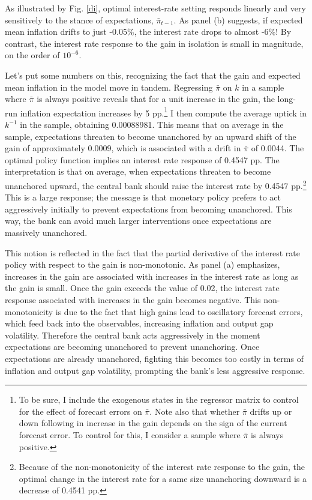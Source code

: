 \documentclass[11pt]{article}
\renewcommand{\[}{\begin{equation}}
\renewcommand{\]}{\end{equation}}
\def\ppMoveFFR{0.4547 }
\begin{document}
As illustrated by Fig. \ref{di}, optimal interest-rate setting responds linearly and very sensitively to the stance of expectations, $\bar{\pi}_{t-1}$. As panel (b) suggests, if expected mean inflation drifts to just -0.05\%, the interest rate drops to almost -6\%! By contrast, the interest rate response to the gain in isolation is small in magnitude, on the order of $10^{-6}$. 

Let's put some numbers on this, recognizing the fact that the gain and expected mean inflation in the model move in tandem. Regressing $\bar{\pi}$ on $k$ in a sample where $\bar{\pi}$ is always positive reveals that for a unit increase in the gain, the long-run inflation expectation increases by 5 pp.\footnote{To be sure, I include the exogenous states in the regressor matrix to control for the effect of forecast errors on $\bar{\pi}$. Note also that whether $\bar{\pi}$ drifts up or down following in increase in the gain depends on the sign of the current forecast error. To control for this, I consider a sample where $\bar{\pi}$ is always positive.} I then compute the average uptick in $k^{-1}$ in the sample, obtaining 0.00088981. This means that on average in the sample, expectations threaten to become unanchored by an upward shift of the gain of approximately 0.0009, which is associated with a drift in $\bar{\pi}$ of 0.0044. The optimal policy function implies an interest rate response of \ppMoveFFR pp. The interpretation is that on average, when expectations threaten to become unanchored upward, the central bank should raise the interest rate by \ppMoveFFR pp.\footnote{Because of the non-monotonicity of the interest rate response to the gain, the optimal change in the interest rate for a same size unanchoring downward is a decrease of 0.4541 pp.} This is a large response; the message is that monetary policy prefers to act aggressively initially to prevent expectations from becoming unanchored. This way, the bank can avoid much larger interventions once expectations are massively unanchored. 

This notion is reflected in the fact that the partial derivative of the interest rate policy with respect to the gain is non-monotonic. As panel (a) emphasizes, increases in the gain are associated with increases in the interest rate as long as the gain is small. Once the gain exceeds the value of 0.02, the interest rate response associated with increases in the gain becomes negative. This non-monotonicity is due to the fact that high gains lead to oscillatory forecast errors, which feed back into the observables, increasing inflation and output gap volatility. Therefore the central bank acts aggressively in the moment expectations are becoming unanchored to prevent unanchoring. Once expectations are already unanchored, fighting this becomes too costly in terms of inflation and output gap volatility, prompting the bank's less aggressive response. 
\end{document}
